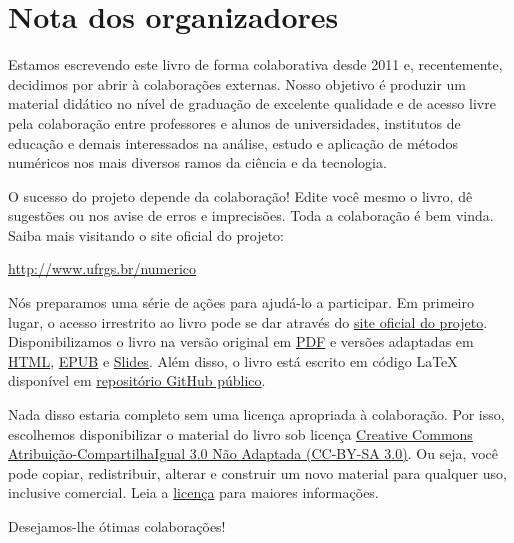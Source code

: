 
\chapter*{Nota dos organizadores}

Estamos escrevendo este livro de forma colaborativa desde 2011 e, recentemente, decidimos por abrir à colaborações externas. Nosso objetivo é produzir um material didático no nível de graduação de excelente qualidade e de acesso livre pela colaboração entre professores e alunos de universidades, institutos de educação e demais interessados na análise, estudo e aplicação de métodos numéricos nos mais diversos ramos da ciência e da tecnologia.

O sucesso do projeto depende da colaboração! Edite você mesmo o livro, dê sugestões ou nos avise de erros e imprecisões. Toda a colaboração é bem vinda. Saiba mais visitando o site oficial do projeto:
\begin{center}
  \url{http://www.ufrgs.br/numerico}
\end{center}

Nós preparamos uma série de ações para ajudá-lo a participar. Em primeiro lugar, o acesso irrestrito ao livro pode se dar através do \href{http://www.ufrgs.br/numerico}{site oficial do projeto}. Disponibilizamos o livro na versão original em \href{https://github.com/livroscolaborativos/CalculoNumerico/blob/master/main.pdf}{PDF} e versões adaptadas em \href{http://www.ufrgs.br/numerico/book_in_webpage/main.html}{HTML}, \href{http://www.ufrgs.br/numerico/book_in_webpage/main.epub}{EPUB} e \href{http://www.ufrgs.br/numerico/book_in_webpage/slide.pdf}{Slides}. Além disso, o livro está escrito em código \LaTeX{} disponível em \href{https://github.com/livroscolaborativos/CalculoNumerico}{repositório GitHub público}. 

Nada disso estaria completo sem uma licença apropriada à colaboração. Por isso, escolhemos disponibilizar o material do livro sob licença \href{https://creativecommons.org/licenses/by-sa/3.0/}{Creative Commons Atribuição-CompartilhaIgual 3.0 Não Adaptada (CC-BY-SA 3.0)}. Ou seja, você pode copiar, redistribuir, alterar e construir um novo material para qualquer uso, inclusive comercial. Leia a \href{https://creativecommons.org/licenses/by-sa/3.0/}{licença} para maiores informações.

\vspace{0.5cm}

Desejamos-lhe ótimas colaborações!

